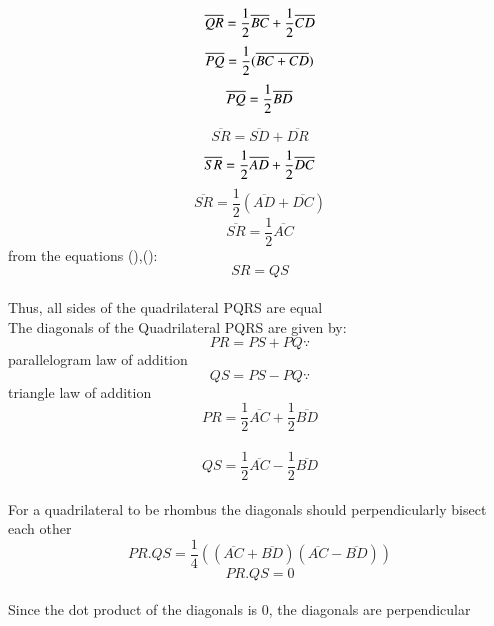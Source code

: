 \documentclass[journal,10pt,twocolumn]{article}
\begin{document}
\begin{equation}
		  \overline{QR}  = \frac{1}{2}\overline{BC} + \frac{1}{2}\overline{CD} \\
\end{equation}
\begin{equation}
	\overline{PQ} =\frac{1}{2}(\overline{BC+CD})\\
\end{equation}
\begin{equation}
	  \overline{PQ} =\frac{1}{2}\overline{BD} \\
\end{equation}


\begin{equation}
	\overline{SR}= \overline{SD} + \overline{DR} 
\end{equation}
\begin{equation}
		  \overline{SR}  = \frac{1}{2}\overline{AD} + \frac{1}{2}\overline{DC} \\
\end{equation}
\begin{equation}
	\overline{SR} = \frac{1}{2}(\overline{AD}+\overline{DC})
\end{equation}
\begin{equation}
	\overline{SR} = \frac{1}{2}\overline{AC}
\end{equation}
from the equations (),():
\begin{equation}
	SR = QS
\end{equation}
\\ Thus, all sides of the quadrilateral PQRS are equal
\\ The diagonals of the Quadrilateral PQRS are given by:
\begin{equation}
	PR = PS+PQ
	\because
\end{equation}
parallelogram law of addition
\begin{equation}
	QS = PS-PQ
	\because
\end{equation}
triangle law of addition
\\ \begin{equation}
	PR = \frac{1}{2}\overline{AC}+\frac{1}{2}\overline{BD}
\end{equation}
\\ \begin{equation}
        QS = \frac{1}{2}\overline{AC}-\frac{1}{2}\overline{BD}
\end{equation}
\\ For a quadrilateral to be rhombus the diagonals should perpendicularly bisect each other
\begin{equation}
	PR.QS = \frac{1}{4}((\overline{AC}+\overline{BD})(\overline{AC}-\overline{BD}))
\end{equation}
\begin{equation}
	PR.QS = 0
\end{equation}
\\Since the dot product of the diagonals is 0, the diagonals are perpendicular
\end{document}
